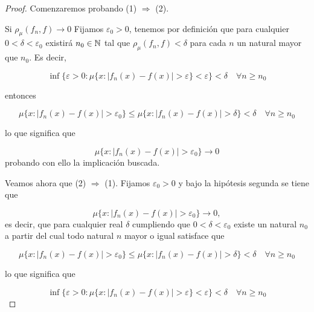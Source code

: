 \begin{proof}
    Comenzaremos probando (1) $\Rightarrow$ (2). 

    Si $\rho_{\mu}(f_n, f) \longrightarrow 0$
    Fijamos $\varepsilon_0 > 0$, tenemos por definición que 
    para cualquier $0 < \delta < \varepsilon_0$ existirá $n_0 \in \mathbb{N}$ tal que 
    $\rho_{\mu}(f_n, f) < \delta$ para cada $n$ un natural mayor que $n_0$. Es decir,  
    

    $$\inf \{ \varepsilon > 0: \mu \{ x : |f_n(x) - f(x)| > \varepsilon \} < \varepsilon \} < \delta \quad \forall n \geq n_0$$

    entonces 

    \begin{equation}
        \mu \{ x : |f_n(x) - f(x)| > \varepsilon_0 \}
        \leq
        \mu \{ x : |f_n(x) - f(x)| > \delta\}
        < \delta 
        \quad 
        \forall n \geq n_0
    \end{equation}

    lo que significa que 

    \begin{equation}
        \mu \{ x : |f_n(x) - f(x)| > \varepsilon_0 \}
        \longrightarrow
        0  
    \end{equation}
    probando con ello la implicación buscada.

    Veamos ahora que (2) $\Rightarrow$ (1). 
    Fijamos $\varepsilon_0 > 0$ y bajo la hipótesis segunda se tiene que 

    \begin{equation}
        \mu \{ x : |f_n(x) - f(x)| > \varepsilon_0 \}
        \longrightarrow
        0,  
    \end{equation}
    es decir, que para cualquier real $\delta$ cumpliendo que $0 < \delta < \varepsilon_0$ 
    existe un natural $n_0$ a partir del cual todo natural $n$ mayor o igual satisface que 
    
    \begin{equation}
        \mu \{ x : |f_n(x) - f(x)| > \varepsilon_0 \}
        \leq
        \mu \{ x : |f_n(x) - f(x)| > \delta\}
        < \delta 
        \quad 
        \forall n \geq n_0
    \end{equation}

    lo que significa que 
    
    \begin{equation}
        \inf \{ \varepsilon > 0:
         \mu \{ 
             x : |f_n(x) - f(x)| > \varepsilon \} < \varepsilon 
             \} 
        < \delta 
        \quad 
        \forall n \geq n_0
    \end{equation}


\end{proof}
